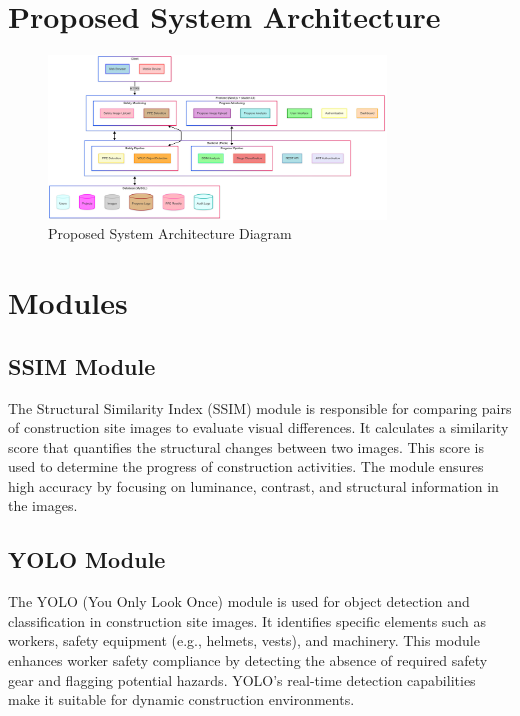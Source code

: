 \documentclass[12pt,a4paper]{report}
\begin{document}
\section{Proposed System Architecture}

\begin{figure}[H]
    \centering
    \includegraphics[width=0.8\textwidth]{images/mermaid-ai-diagram-2025-04-27-100441.png}
    \caption{Proposed System Architecture Diagram}
    \label{fig:proposed-system-architecture}
\end{figure}


\section{Modules}

\subsection{SSIM Module}
The Structural Similarity Index (SSIM) module is responsible for comparing pairs of construction site images to evaluate visual differences. It calculates a similarity score that quantifies the structural changes between two images. This score is used to determine the progress of construction activities. The module ensures high accuracy by focusing on luminance, contrast, and structural information in the images.

\subsection{YOLO Module}
The YOLO (You Only Look Once) module is used for object detection and classification in construction site images. It identifies specific elements such as workers, safety equipment (e.g., helmets, vests), and machinery. This module enhances worker safety compliance by detecting the absence of required safety gear and flagging potential hazards. YOLO's real-time detection capabilities make it suitable for dynamic construction environments.
\end{document}
